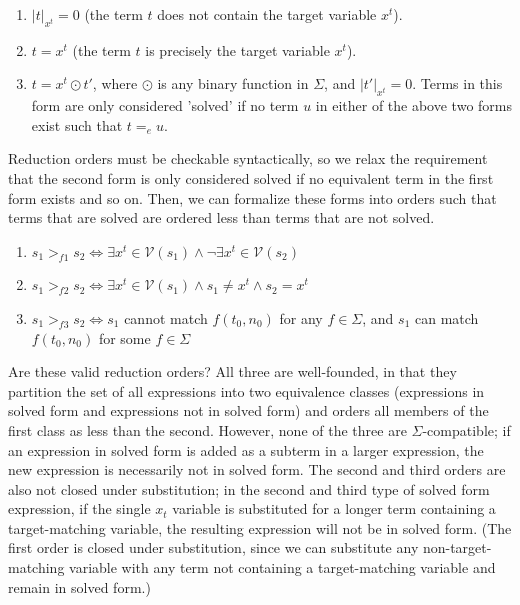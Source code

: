 \begin{enumerate}
  \item $|t|_{x^t} = 0$ (the term $t$ does not contain the target variable $x^t$).
  \item $t = x^t$ (the term $t$ is precisely the target variable $x^t$).
  \item $t = x^t \odot t'$, where $\odot$ is any binary function in $\Sigma$, and $|t'|_{x^t} = 0$. Terms in this form are only considered 'solved' if no term $u$ in either of the above two forms exist such that $t =_e u$.
\end{enumerate}

Reduction orders must be checkable syntactically, so we relax the requirement that the second form is only considered solved if no equivalent term in the first form exists and so on. Then, we can formalize these forms into orders such that terms that are solved are ordered less than terms that are not solved.

\begin{enumerate}
    \item $s_1 >_{f1} s_2 \iff \exists x^t \in \mathcal{V}(s_1) \wedge \neg \exists x^t \in \mathcal{V}(s_2)$
    \item $s_1 >_{f2} s_2 \iff \exists x^t \in \mathcal{V}(s_1) \wedge s_1 \neq x^t \wedge s_2 = x^t$
    \item $s_1 >_{f3} s_2 \iff s_1$ cannot match $f(t_0, n_0)$ for any $f \in \Sigma$, and $s_1$ can match $f(t_0, n_0)$ for some $f \in \Sigma$
\end{enumerate}

Are these valid reduction orders? All three are well-founded, in that they partition the set of all expressions into two equivalence classes (expressions in solved form and expressions not in solved form) and orders all members of the first class as less than the second. However, none of the three are $\Sigma$-compatible; if an expression in solved form is added as a subterm in a larger expression, the new expression is necessarily not in solved form. The second and third orders are also not closed under substitution; in the second and third type of solved form expression, if the single $x_t$ variable is substituted for a longer term containing a target-matching variable, the resulting expression will not be in solved form. (The first order is closed under substitution, since we can substitute any non-target-matching variable with any term not containing a target-matching variable and remain in solved form.)

